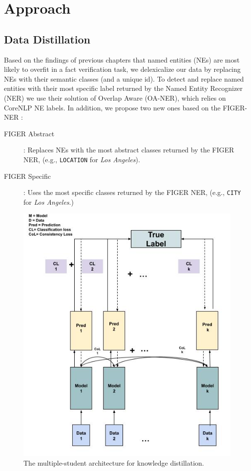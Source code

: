 \section{Approach}

\subsection{Data Distillation}

Based on the findings of previous chapters that named entities (NEs) are most likely to overfit in a fact verification task, we delexicalize our data by replacing NEs with their semantic classes (and a unique id). To detect and replace named entities with their most specific label returned by the Named Entity Recognizer (NER) we use their solution of Overlap Aware (OA-NER), which relies on CoreNLP \cite{manning2014stanford} NE labels. In addition, we propose two new ones based on the FIGER-NER \citep{ling2012fine}: 

\begin{description}
\item[FIGER Abstract]: Replaces NEs with the most abstract classes returned by the FIGER NER, (e.g.,  {\tt LOCATION} for {\em Los Angeles}).
\item[FIGER Specific]:  Uses the most specific classes returned by the FIGER NER, (e.g.,  {\tt CITY} for {\em Los Angeles}.)
\end{description}


\begin{figure}[t]
\center
\includegraphics[width=1\linewidth]{mainmatter/emnlp2021_gl/multiple_students_architecture.jpeg}
\caption{ The multiple-student architecture for knowledge distillation.}
\label{multiple_students_architecture}
\vspace{-7mm}
\end{figure}
